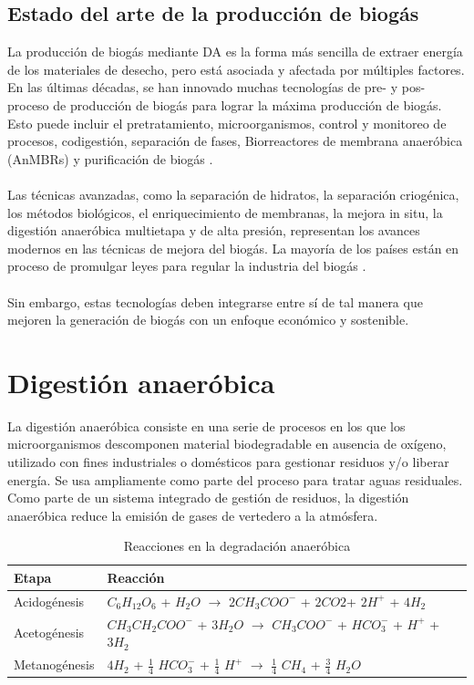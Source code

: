 \documentclass[a4paper,11pt]{article}
\begin{document}
\subsection{Estado del arte de la producción de biogás}
La producción de biogás mediante DA es la forma más sencilla de extraer energía de los materiales de desecho, pero está asociada y afectada por múltiples factores. En las últimas décadas, se han innovado muchas tecnologías de pre- y pos- proceso de producción de biogás para lograr la máxima producción de biogás. Esto puede incluir el pretratamiento, microorganismos, control y monitoreo de procesos, codigestión, separación de fases, Biorreactores de membrana anaeróbica (AnMBRs) y purificación de biogás \cite{Maurya2019}.
\\\\
Las técnicas avanzadas, como la separación de hidratos, la separación criogénica, los métodos biológicos, el enriquecimiento de membranas, la mejora in situ, la digestión anaeróbica multietapa y de alta presión, representan los avances modernos en las técnicas de mejora del biogás. La mayoría de los países están en proceso de promulgar leyes para regular la industria del biogás \cite{Korbag2020}.
\\\\
Sin embargo, estas tecnologías deben integrarse entre sí de tal manera que mejoren la generación de biogás con un enfoque económico y sostenible. 

\section{Digestión anaeróbica}
La digestión anaeróbica consiste en una serie de procesos en los que los microorganismos descomponen material biodegradable en ausencia de oxígeno, utilizado con fines industriales o domésticos para gestionar residuos y/o liberar energía. Se usa ampliamente como parte del proceso para tratar aguas residuales. Como parte de un sistema integrado de gestión de residuos, la digestión anaeróbica reduce la emisión de gases de vertedero a la atmósfera. 

\begin{table}[h]
\centering
\begin{tabular}{|p{6cm}|p{6cm}|}
\hline
{\bf Etapa} & {\bf Reacción} \\
\hline
Acidogénesis & $C_{6}H_{12}O_{6}$ + $H_{2}O$ $\longrightarrow$ $2CH_{3}COO^-$ + $2CO2$+ $2H^+$ + $4H_{2}$ \\
\hline
Acetogénesis & $CH_{3}CH_{2}COO^-$  + $3H_{2}O$ $\longrightarrow$ $CH_{3}COO^-$ + $HCO_{3}^-$ + $H^+$ + $3H_{2}$ \\
\hline
Metanogénesis &  $4H_{2}$ + $\frac{1}{4}$ $HCO_{3}^-$ + $\frac{1}{4}$ $H^+$ $\longrightarrow$ $\frac{1}{4}$ $CH_{4}$ + $\frac{3}{4}$ $H_{2}O$ \\
\hline
\end{tabular}
\caption{Reacciones en la degradación anaeróbica \cite{Moraes2015}}
\label{Tabla 1}
\end{table}
\end{document}
